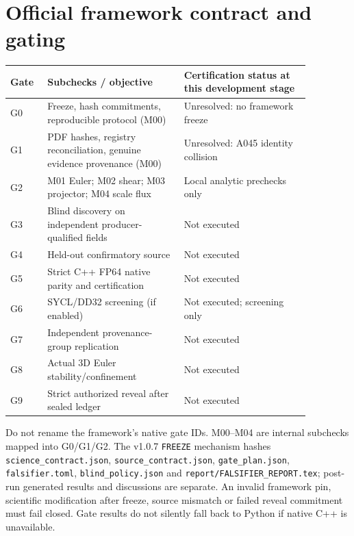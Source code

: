 \documentclass[10pt,a4paper]{article}
\newcommand{\code}[1]{\texttt{#1}}
\begin{document}
\section{Official framework contract and gating}
\small
\begin{longtable}{p{0.10\linewidth}p{0.40\linewidth}p{0.37\linewidth}}
\toprule Gate & Subchecks / objective & Certification status at this development stage\\\midrule
\endhead
G0 & Freeze, hash commitments, reproducible protocol (M00) & Unresolved: no framework freeze\\
G1 & PDF hashes, registry reconciliation, genuine evidence provenance (M00) & Unresolved: A045 identity collision\\
G2 & M01 Euler; M02 shear; M03 projector; M04 scale flux & Local analytic prechecks only\\
G3 & Blind discovery on independent producer-qualified fields & Not executed\\
G4 & Held-out confirmatory source & Not executed\\
G5 & Strict C++ FP64 native parity and certification & Not executed\\
G6 & SYCL/DD32 screening (if enabled) & Not executed; screening only\\
G7 & Independent provenance-group replication & Not executed\\
G8 & Actual 3D Euler stability/confinement & Not executed\\
G9 & Strict authorized reveal after sealed ledger & Not executed\\\bottomrule
\end{longtable}
\normalsize
Do not rename the framework's native gate IDs. M00--M04 are internal subchecks mapped into G0/G1/G2. The v1.0.7 \code{FREEZE} mechanism hashes \code{science\_contract.json}, \code{source\_contract.json}, \code{gate\_plan.json}, \code{falsifier.toml}, \code{blind\_policy.json} and \code{report/FALSIFIER\_REPORT.tex}; post-run generated results and discussions are separate. An invalid framework pin, scientific modification after freeze, source mismatch or failed reveal commitment must fail closed. Gate results do not silently fall back to Python if native C++ is unavailable.
\end{document}
